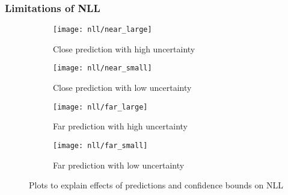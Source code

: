 \subsubsection{Limitations of NLL}
\begin{figure}[H]
\centering
\begin{subfigure}[b]{0.45\textwidth}
	\centering
	\texttt{[image: nll/near\_large]}
	\caption{Close prediction with high uncertainty}
	\label{fig_1d_functions_nll0}
\end{subfigure}
\hfill
\begin{subfigure}[b]{0.45\textwidth}
	\centering
	\texttt{[image: nll/near\_small]}
	\caption{Close prediction with low uncertainty}
	\label{fig_1d_functions_nll1}
\end{subfigure}
\hfill
\begin{subfigure}[b]{0.45\textwidth}
	\centering
	\texttt{[image: nll/far\_large]}
	\caption{Far prediction with high uncertainty}
	\label{fig_1d_functions_nll2}
\end{subfigure}
\hfill
\begin{subfigure}[b]{0.45\textwidth}
	\centering
	\texttt{[image: nll/far\_small]}
	\caption{Far prediction with low uncertainty}
	\label{fig_1d_functions_nll3}
\end{subfigure}
\hfill
\caption{Plots to explain effects of predictions and confidence bounds on NLL }
\label{fig_1d_functions_nll}
\end{figure}
